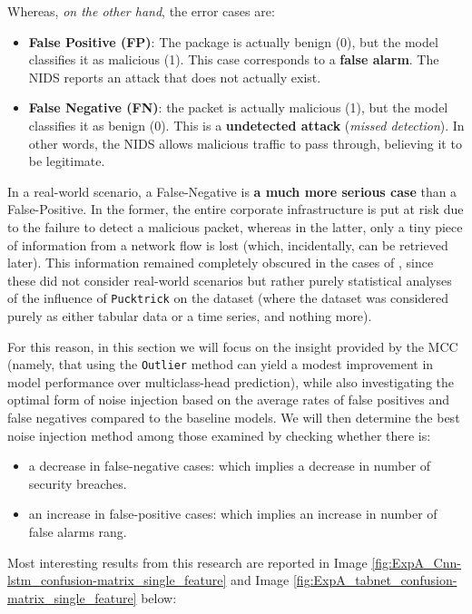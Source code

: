 \documentclass[../main.tex]{subfiles}
\begin{document}
Whereas, \emph{on the other hand}, the error cases are:
\begin{itemize}
\item
  \textbf{False Positive (FP)}: The package is actually benign (0), but the model classifies it as malicious (1). This case corresponds to a \textbf{false alarm}. The NIDS reports an attack that does not actually exist.
\item
  \textbf{False Negative (FN)}: the packet is actually malicious (1), but the model classifies it as benign (0). This is a \textbf{undetected attack} (\emph{missed detection}). In other words, the NIDS allows malicious traffic to pass through, believing it to be legitimate. 
\end{itemize}

In a real-world scenario, a False-Negative is \textbf{a much more serious case} than a False-Positive. In the former, the entire corporate infrastructure is put at risk due to the failure to detect a malicious packet, whereas in the latter, only a tiny piece of information from a network flow is lost (which, incidentally, can be retrieved later). This information remained completely obscured in the cases of , since these did not consider real-world scenarios but rather purely statistical analyses of the influence of \texttt{Pucktrick} on the dataset (where the dataset was considered purely as either tabular data or a time series, and nothing more).

For this reason, in this section we will focus on the insight provided by the MCC (namely, that using the \texttt{Outlier} method can yield a modest improvement in model performance over multiclass-head prediction), while also investigating the optimal form of noise injection based on the average rates of false positives and false negatives compared to the baseline models. We will then determine the best noise injection method among those examined by checking whether there is:
\begin{itemize}
    \item a decrease in false-negative cases: which implies a decrease in number of security breaches.
    \item an increase in false-positive cases: which implies an increase in number of false alarms rang.
\end{itemize}

Most interesting results from this research are reported in Image \ref{fig:ExpA_Cnn-lstm_confusion-matrix_single_feature} and Image \ref{fig:ExpA_tabnet_confusion-matrix_single_feature} below:
\end{document}
